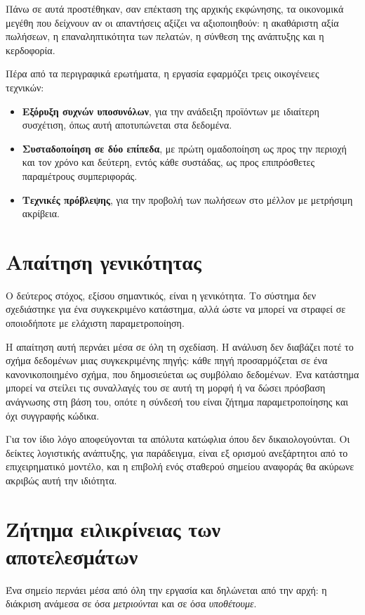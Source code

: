 Πάνω σε αυτά προστέθηκαν, σαν επέκταση της αρχικής εκφώνησης, τα οικονομικά
μεγέθη που δείχνουν αν οι απαντήσεις αξίζει να αξιοποιηθούν: η ακαθάριστη αξία
πωλήσεων, η επαναληπτικότητα των πελατών, η σύνθεση της ανάπτυξης και η
κερδοφορία.

Πέρα από τα περιγραφικά ερωτήματα, η εργασία εφαρμόζει τρεις οικογένειες
τεχνικών:

\begin{itemize}
  \item \textbf{Εξόρυξη συχνών υποσυνόλων}, για την ανάδειξη προϊόντων με
        ιδιαίτερη συσχέτιση, όπως αυτή αποτυπώνεται στα δεδομένα.
  \item \textbf{Συσταδοποίηση σε δύο επίπεδα}, με πρώτη ομαδοποίηση ως προς
        την περιοχή και τον χρόνο και δεύτερη, εντός κάθε συστάδας, ως προς
        επιπρόσθετες παραμέτρους συμπεριφοράς.
  \item \textbf{Τεχνικές πρόβλεψης}, για την προβολή των πωλήσεων στο μέλλον
        με μετρήσιμη ακρίβεια.
\end{itemize}

\section{Απαίτηση γενικότητας}

Ο δεύτερος στόχος, εξίσου σημαντικός, είναι η γενικότητα. Το σύστημα δεν
σχεδιάστηκε για ένα συγκεκριμένο κατάστημα, αλλά ώστε να μπορεί να στραφεί σε
οποιοδήποτε με ελάχιστη παραμετροποίηση.

Η απαίτηση αυτή περνάει μέσα σε όλη τη σχεδίαση. Η ανάλυση δεν διαβάζει ποτέ το
σχήμα δεδομένων μιας συγκεκριμένης πηγής: κάθε πηγή προσαρμόζεται σε ένα
κανονικοποιημένο σχήμα, που δημοσιεύεται ως συμβόλαιο δεδομένων. Ένα κατάστημα
μπορεί να στείλει τις συναλλαγές του σε αυτή τη μορφή ή να δώσει πρόσβαση
ανάγνωσης στη βάση του, οπότε η σύνδεσή του είναι ζήτημα παραμετροποίησης και
όχι συγγραφής κώδικα.

Για τον ίδιο λόγο αποφεύγονται τα απόλυτα κατώφλια όπου δεν δικαιολογούνται. Οι
δείκτες λογιστικής ανάπτυξης, για παράδειγμα, είναι εξ ορισμού ανεξάρτητοι από
το επιχειρηματικό μοντέλο, και η επιβολή ενός σταθερού σημείου αναφοράς θα
ακύρωνε ακριβώς αυτή την ιδιότητα.

\section{Ζήτημα ειλικρίνειας των αποτελεσμάτων}

Ένα σημείο περνάει μέσα από όλη την εργασία και δηλώνεται από την αρχή: η
διάκριση ανάμεσα σε όσα \emph{μετριούνται} και σε όσα \emph{υποθέτουμε}.

